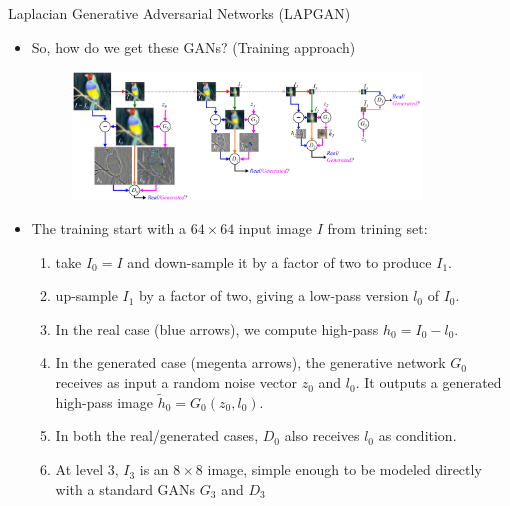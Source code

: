 \documentclass[10pt]{beamer}
\begin{document}
	\begin{frame}{Laplacian Generative Adversarial Networks (LAPGAN)}
		\begin{itemize}
			\item So, how do we get these GANs? (Training approach)
			\onslide<2->
			\begin{figure}
				\includegraphics<2->[width=25em]{figures/LAPGAN-general-structure.PNG}
			\end{figure}
			\item The training start with a $64\times64$ input image $I$ from trining set:
			\begin{enumerate}
				\item take $I_0=I$ and down-sample it by a factor of two to produce $I_1$.
				\onslide<5->
				\item up-sample $I_1$ by a factor of two, giving a low-pass version $l_0$ of $I_0$.
				\onslide<6->
				\item In the real case (blue arrows), we compute high-pass $h_0=I_0-l_0$.
				\onslide<7->
				\item In the generated case (megenta arrows), the generative network $G_0$ receives as input a random noise vector $z_0$ and $l_0$. It outputs a generated high-pass image $\tilde{h}_0=G_0(z_0,l_0)$.
				\onslide<8->
				\item In both the real/generated cases, $D_0$ also receives $l_0$ as condition.
				\onslide<9->
				\item At level 3, $I_3$ is an $8\times8$ image, simple enough to be modeled directly with a standard GANs $G_3$ and $D_3$
			\end{enumerate}
		\end{itemize}
	\end{frame}
\end{document}
